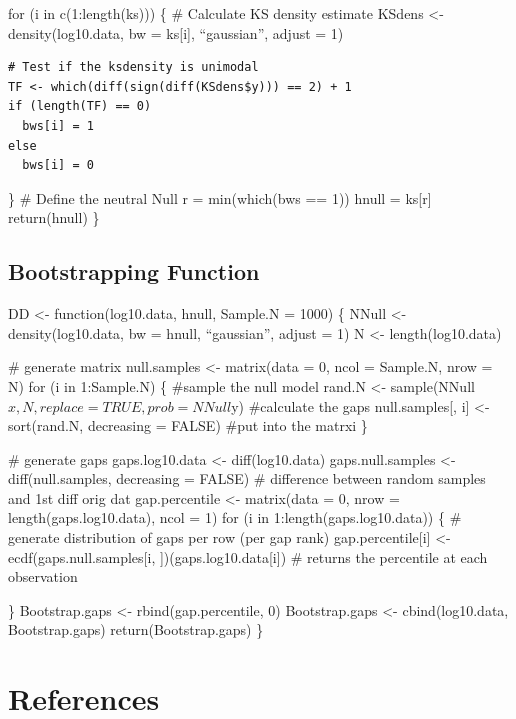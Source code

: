 \documentclass[12pt,twoside,openany]{reedthesis}
\begin{document}
for (i in c(1:length(ks))) \{
\# Calculate KS density estimate
KSdens \textless- density(log10.data, bw = ks{[}i{]}, ``gaussian'', adjust = 1)
\begin{verbatim}
# Test if the ksdensity is unimodal
TF <- which(diff(sign(diff(KSdens$y))) == 2) + 1
if (length(TF) == 0)
  bws[i] = 1
else
  bws[i] = 0
\end{verbatim}
\}
\# Define the neutral Null
r = min(which(bws == 1))
hnull = ks{[}r{]}
return(hnull)
\}

\hypertarget{bootstrapping-function}{%
\section{Bootstrapping Function}\label{bootstrapping-function}}

DD \textless- function(log10.data, hnull, Sample.N = 1000) \{
NNull \textless- density(log10.data, bw = hnull, ``gaussian'', adjust = 1)
N \textless- length(log10.data)

\# generate matrix
null.samples \textless- matrix(data = 0,
ncol = Sample.N,
nrow = N)
for (i in 1:Sample.N) \{
\#sample the null model
rand.N \textless- sample(NNull\(x, N, replace = TRUE, prob = NNull\)y)
\#calculate the gaps
null.samples{[}, i{]} \textless- sort(rand.N, decreasing = FALSE)
\#put into the matrxi
\}

\# generate gaps
gaps.log10.data \textless- diff(log10.data)
gaps.null.samples \textless- diff(null.samples, decreasing = FALSE) \# difference between random samples and 1st diff orig dat
gap.percentile \textless- matrix(data = 0,
nrow = length(gaps.log10.data),
ncol = 1)
for (i in 1:length(gaps.log10.data)) \{
\# generate distribution of gaps per row (per gap rank)
gap.percentile{[}i{]} \textless-
ecdf(gaps.null.samples{[}i, {]})(gaps.log10.data{[}i{]}) \# returns the percentile at each observation

\}
Bootstrap.gaps \textless- rbind(gap.percentile, 0)
Bootstrap.gaps \textless- cbind(log10.data, Bootstrap.gaps)
return(Bootstrap.gaps)
\}

\backmatter

\hypertarget{references}{%
\chapter*{References}\label{references}}


\noindent
\end{document}
